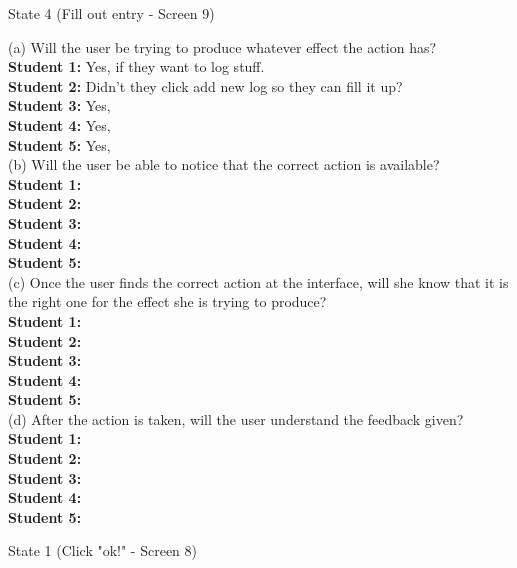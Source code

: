 \documentclass[pdftex,12pt,a4paper]{report}
\begin{document}
\begin{center}
State 4 (Fill out entry - Screen 9)
\end{center}

\noindent(a) Will the user be trying to produce whatever effect the action has?
\\\indent \textbf{Student 1:} Yes, if they want to log stuff.
\\\indent \textbf{Student 2:} Didn't they click add new log so they can fill it up?
\\\indent \textbf{Student 3:} Yes, 
\\\indent \textbf{Student 4:} Yes,
\\\indent \textbf{Student 5:} Yes, 
\\(b) Will the user be able to notice that the correct action is available?
\\\indent \textbf{Student 1:} 
\\\indent \textbf{Student 2:} 
\\\indent \textbf{Student 3:} 
\\\indent \textbf{Student 4:} 
\\\indent \textbf{Student 5:} 
\\(c) Once the user finds the correct action at the interface, will she know that it is the right one for the effect she is trying to produce?
\\\indent \textbf{Student 1:} 
\\\indent \textbf{Student 2:} 
\\\indent \textbf{Student 3:} 
\\\indent \textbf{Student 4:} 
\\\indent \textbf{Student 5:} 
\\(d) After the action is taken, will the user understand the feedback given?
\\\indent \textbf{Student 1:} 
\\\indent \textbf{Student 2:} 
\\\indent \textbf{Student 3:} 
\\\indent \textbf{Student 4:} 
\\\indent \textbf{Student 5:} 

\begin{center}
State 1 (Click "ok!" - Screen 8)
\end{center}
\end{document}
